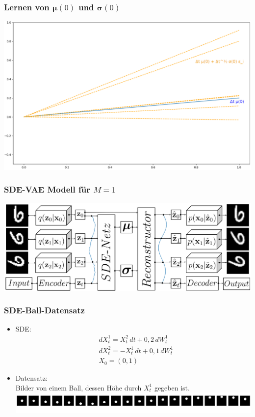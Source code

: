 \begin{frame}
	\frametitle{Lernen von $\bm{\mu}(0)$ und $\bm{\sigma}(0)$}
	\includegraphics[scale=0.3]{Bilder/SDE_Erklaerung.png}
	
\end{frame}


\begin{frame}
	\frametitle{SDE-VAE Modell für $M=1$}
	\includegraphics[scale=0.3]{Bilder/SDEVAEGrafik.png}
\end{frame}


\begin{frame}
	\frametitle{SDE-Ball-Datensatz}
	\begin{itemize}
		\item SDE:
		\begin{align*}
		& dX^1_t = X^2_t \, dt + 0,2 \, dW^1_t\\
		& dX^2_t = -X^1_t \, dt + 0,1 \, dW^1_t\\
		& X_0 = (0,1)
		\end{align*}
		
		\item Datensatz:\\
		Bilder von einem Ball, dessen Höhe durch $X^1_t$ gegeben ist.\\
		\includegraphics[scale=0.25]{Bilder/datasetSDE.png}
	\end{itemize}
\end{frame}

